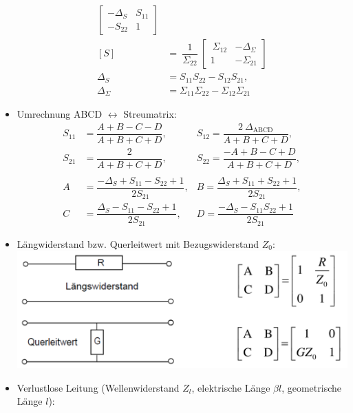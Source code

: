 \begin{itemize}
\begin{align*}
\begin{bmatrix}
                    -\Delta_S & S_{11}\\
                    -S_{22} & 1\
            \end{bmatrix}\\
            [S]\
            &=\
             \dfrac{1}{\Sigma_{22}}\
            \begin{bmatrix}\
                    \Sigma_{12} & -\Delta_\Sigma\\
                    1 & -\Sigma_{21}
            \end{bmatrix}\\
            \Delta_S &= S_{11}S_{22} - S_{12}S_{21},\\
            \Delta_\Sigma &= \Sigma_{11}\Sigma_{22} - \Sigma_{12}\Sigma_{21}
        \end{align*}
        \item Umrechnung ABCD $\leftrightarrow$ Streumatrix:
            \begin{align*}
                S_{11} &= \dfrac{A+B-C-D}{A+B+C+D}, &S_{12} = \dfrac{2\:\Delta_{\mathrm{ABCD}}}{A+B+C+D},\\
                S_{21} &= \dfrac{2}{A+B+C+D}, &S_{22} = \dfrac{-A+B-C+D}{A+B+C+D},\\\\
                A &= \dfrac{-\Delta_S + S_{11} - S_{22} + 1}{2 S_{21}},
                &B = \dfrac{\Delta_S + S_{11} + S_{22} + 1}{2 S_{21}},\\
                C &= \dfrac{\Delta_S - S_{11} - S_{22} + 1}{2 S_{21}},
                &D = \dfrac{-\Delta_S - S_{11} S_{22} + 1}{2 S_{21}}
            \end{align*}
        \item Längwiderstand bzw. Querleitwert mit Bezugswiderstand $Z_0$:\\
            \includegraphics[width=0.35\paperheight]{content/hfmess/pictures/kettenmatrix_widerstand_leitwert.png}
        \item Verlustlose Leitung (Wellenwiderstand $Z_l$, elektrische Länge $\beta l$, geometrische Länge $l$):

\end{itemize}

